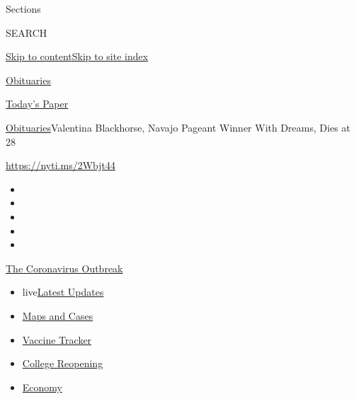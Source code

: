 Sections

SEARCH

\protect\hyperlink{site-content}{Skip to
content}\protect\hyperlink{site-index}{Skip to site index}

\href{https://www.nytimes3xbfgragh.onion/section/obituaries}{Obituaries}

\href{https://myaccount.nytimes3xbfgragh.onion/auth/login?response_type=cookie\&client_id=vi}{}

\href{https://www.nytimes3xbfgragh.onion/section/todayspaper}{Today's
Paper}

\href{/section/obituaries}{Obituaries}\textbar{}Valentina Blackhorse,
Navajo Pageant Winner With Dreams, Dies at 28

\url{https://nyti.ms/2Wbjt44}

\begin{itemize}
\item
\item
\item
\item
\item
\end{itemize}

\href{https://www.nytimes3xbfgragh.onion/news-event/coronavirus?action=click\&pgtype=Article\&state=default\&region=TOP_BANNER\&context=storylines_menu}{The
Coronavirus Outbreak}

\begin{itemize}
\tightlist
\item
  live\href{https://www.nytimes3xbfgragh.onion/2020/08/04/world/coronavirus-covid-19.html?action=click\&pgtype=Article\&state=default\&region=TOP_BANNER\&context=storylines_menu}{Latest
  Updates}
\item
  \href{https://www.nytimes3xbfgragh.onion/interactive/2020/us/coronavirus-us-cases.html?action=click\&pgtype=Article\&state=default\&region=TOP_BANNER\&context=storylines_menu}{Maps
  and Cases}
\item
  \href{https://www.nytimes3xbfgragh.onion/interactive/2020/science/coronavirus-vaccine-tracker.html?action=click\&pgtype=Article\&state=default\&region=TOP_BANNER\&context=storylines_menu}{Vaccine
  Tracker}
\item
  \href{https://www.nytimes3xbfgragh.onion/2020/08/02/us/covid-college-reopening.html?action=click\&pgtype=Article\&state=default\&region=TOP_BANNER\&context=storylines_menu}{College
  Reopening}
\item
  \href{https://www.nytimes3xbfgragh.onion/live/2020/08/03/business/stock-market-today-coronavirus?action=click\&pgtype=Article\&state=default\&region=TOP_BANNER\&context=storylines_menu}{Economy}
\end{itemize}


